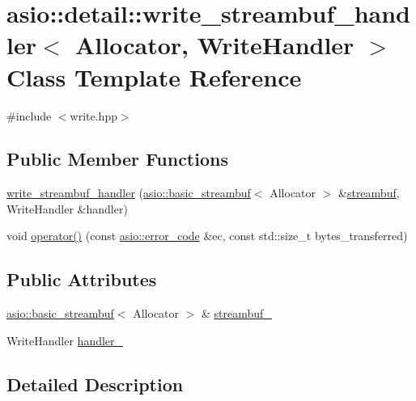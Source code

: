 \hypertarget{classasio_1_1detail_1_1write__streambuf__handler}{}\section{asio\+:\+:detail\+:\+:write\+\_\+streambuf\+\_\+handler$<$ Allocator, Write\+Handler $>$ Class Template Reference}
\label{classasio_1_1detail_1_1write__streambuf__handler}


{\ttfamily \#include $<$write.\+hpp$>$}

\subsection*{Public Member Functions}
\begin{DoxyCompactItemize}
\item 
\hyperlink{classasio_1_1detail_1_1write__streambuf__handler_a706287ae77ec1e8a295d6f325342ae85}{write\+\_\+streambuf\+\_\+handler} (\hyperlink{classasio_1_1basic__streambuf}{asio\+::basic\+\_\+streambuf}$<$ Allocator $>$ \&\hyperlink{namespaceasio_a6a7ba348943527312eeace3492bf32ee}{streambuf}, Write\+Handler \&handler)
\item 
void \hyperlink{classasio_1_1detail_1_1write__streambuf__handler_a9459023060a0b5e0cd73e08471307ded}{operator()} (const \hyperlink{classasio_1_1error__code}{asio\+::error\+\_\+code} \&ec, const std\+::size\+\_\+t bytes\+\_\+transferred)
\end{DoxyCompactItemize}
\subsection*{Public Attributes}
\begin{DoxyCompactItemize}
\item 
\hyperlink{classasio_1_1basic__streambuf}{asio\+::basic\+\_\+streambuf}$<$ Allocator $>$ \& \hyperlink{classasio_1_1detail_1_1write__streambuf__handler_a5398d2ea03dcbf5191fc89e167f4026b}{streambuf\+\_\+}
\item 
Write\+Handler \hyperlink{classasio_1_1detail_1_1write__streambuf__handler_a1f3a23000dc4fe93e7c2a5dfbce80f54}{handler\+\_\+}
\end{DoxyCompactItemize}


\subsection{Detailed Description}
